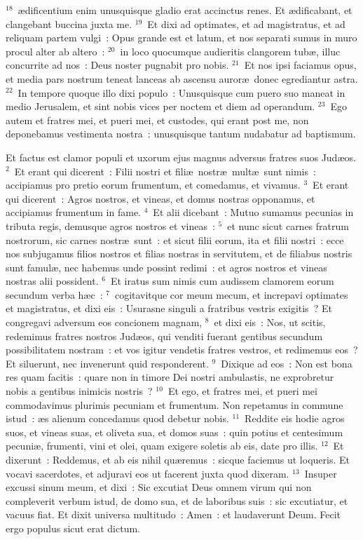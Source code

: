 ${}^{18}$~\ae dificentium enim unusquisque gladio erat accinctus renes. Et \ae dificabant, et clangebant buccina juxta me.
${}^{19}$~Et dixi ad optimates, et ad magistratus, et ad reliquam partem vulgi~: Opus grande est et latum, et nos separati sumus in muro procul alter ab altero~:
${}^{20}$~in loco quocumque audieritis clangorem tub\ae , illuc concurrite ad nos~: Deus noster pugnabit pro nobis.
${}^{21}$~Et nos ipsi faciamus opus, et media pars nostrum teneat lanceas ab ascensu auror\ae\ donec egrediantur astra.
${}^{22}$~In tempore quoque illo dixi populo~: Unusquisque cum puero suo maneat in medio Jerusalem, et sint nobis vices per noctem et diem ad operandum.
${}^{23}$~Ego autem et fratres mei, et pueri mei, et custodes, qui erant post me, non deponebamus vestimenta nostra~: unusquisque tantum nudabatur ad baptismum.

\lettrine[lines=10,image=true,loversize=0.05,lraise=-0.03]{E}{}t factus est clamor populi et uxorum ejus magnus adversus fratres suos Jud\ae os.
${}^{2}$~Et erant qui dicerent~: Filii nostri et fili\ae\ nostr\ae\ mult\ae\ sunt nimis~: accipiamus pro pretio eorum frumentum, et comedamus, et vivamus.
${}^{3}$~Et erant qui dicerent~: Agros nostros, et vineas, et domus nostras opponamus, et accipiamus frumentum in fame.
${}^{4}$~Et alii dicebant~: Mutuo sumamus pecunias in tributa regis, demusque agros nostros et vineas~:
${}^{5}$~et nunc sicut carnes fratrum nostrorum, sic carnes nostr\ae\ sunt~: et sicut filii eorum, ita et filii nostri~: ecce nos subjugamus filios nostros et filias nostras in servitutem, et de filiabus nostris sunt famul\ae , nec habemus unde possint redimi~: et agros nostros et vineas nostras alii possident.
${}^{6}$~Et iratus sum nimis cum audissem clamorem eorum secundum verba h\ae c~:
${}^{7}$~cogitavitque cor meum mecum, et increpavi optimates et magistratus, et dixi eis~: Usurasne singuli a fratribus vestris exigitis~? Et congregavi adversum eos concionem magnam,
${}^{8}$~et dixi eis~: Nos, ut scitis, redemimus fratres nostros Jud\ae os, qui venditi fuerant gentibus secundum possibilitatem nostram~: et vos igitur vendetis fratres vestros, et redimemus eos~? Et siluerunt, nec invenerunt quid responderent.
${}^{9}$~Dixique ad eos~: Non est bona res quam facitis~: quare non in timore Dei nostri ambulastis, ne exprobretur nobis a gentibus inimicis nostris~?
${}^{10}$~Et ego, et fratres mei, et pueri mei commodavimus plurimis pecuniam et frumentum. Non repetamus in commune istud~: \ae s alienum concedamus quod debetur nobis.
${}^{11}$~Reddite eis hodie agros suos, et vineas suas, et oliveta sua, et domos suas~: quin potius et centesimum pecuni\ae , frumenti, vini et olei, quam exigere soletis ab eis, date pro illis.
${}^{12}$~Et dixerunt~: Reddemus, et ab eis nihil qu\ae remus~: sicque faciemus ut loqueris. Et vocavi sacerdotes, et adjuravi eos ut facerent juxta quod dixeram.
${}^{13}$~Insuper excussi sinum meum, et dixi~: Sic excutiat Deus omnem virum qui non compleverit verbum istud, de domo sua, et de laboribus suis~: sic excutiatur, et vacuus fiat. Et dixit universa multitudo~: Amen~: et laudaverunt Deum. Fecit ergo populus sicut erat dictum.


